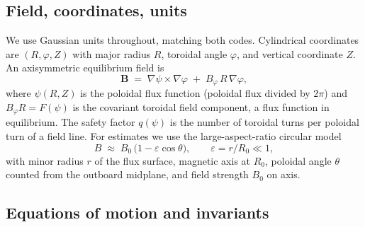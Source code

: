 \documentclass[11pt,a4paper]{article}
\begin{document}
\subsection{Field, coordinates, units}

We use Gaussian units throughout, matching both codes. Cylindrical
coordinates are $(R,\varphi,Z)$ with major radius $R$, toroidal angle
$\varphi$, and vertical coordinate $Z$. An axisymmetric equilibrium field is
\begin{equation}
  \bm B \;=\; \nabla\psi \times \nabla\varphi \;+\; B_\varphi\, R\,\nabla\varphi ,
  \label{eq:field}
\end{equation}
where $\psi(R,Z)$ is the poloidal flux function (poloidal flux divided by
$2\pi$) and $B_\varphi R = F(\psi)$ is the covariant toroidal field component,
a flux function in equilibrium. The safety factor $q(\psi)$ is the number of
toroidal turns per poloidal turn of a field line. For estimates we use the
large-aspect-ratio circular model
\begin{equation}
  B \;\approx\; B_0\,\bigl(1 - \varepsilon\cos\theta\bigr),
  \qquad \varepsilon = r/R_0 \ll 1,
  \label{eq:Bcirc}
\end{equation}
with minor radius $r$ of the flux surface, magnetic axis at $R_0$, poloidal
angle $\theta$ counted from the outboard midplane, and field strength $B_0$
on axis.

\subsection{Equations of motion and invariants}
\end{document}
